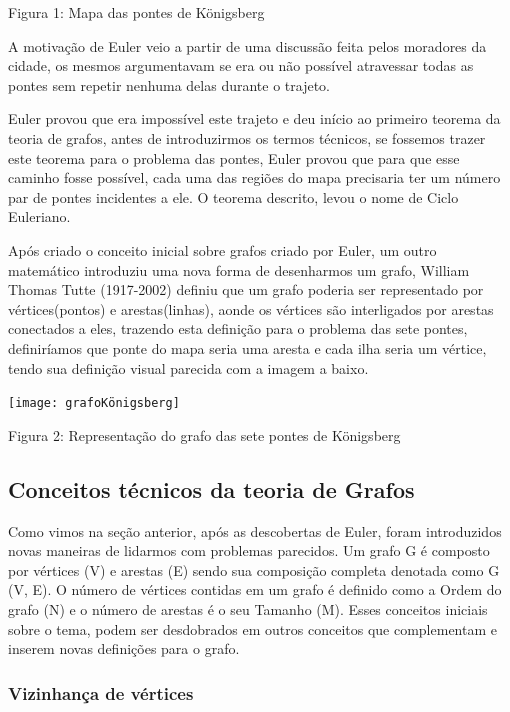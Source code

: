 \documentclass[12pt]{article}
\begin{document}
    Figura 1: Mapa das pontes de Königsberg
   
    A motivação de Euler veio a partir de uma discussão feita pelos moradores da cidade, os mesmos argumentavam se era ou não possível atravessar todas as pontes sem repetir nenhuma delas durante o trajeto.
   
   Euler provou que era impossível este trajeto e deu início ao primeiro teorema da teoria de grafos, antes de introduzirmos os termos técnicos, se fossemos trazer este teorema para o problema das pontes, Euler provou que para que esse caminho fosse possível, cada uma das regiões do mapa precisaria ter um número par de pontes incidentes a ele. O teorema descrito, levou o nome de Ciclo Euleriano.
   
   Após criado o conceito inicial sobre grafos criado por Euler, um outro matemático introduziu uma nova forma de desenharmos um grafo, William Thomas Tutte (1917-2002) definiu que um grafo poderia ser representado por vértices(pontos) e arestas(linhas), aonde os vértices são interligados por arestas conectados a eles, trazendo esta definição para o problema das sete pontes, definiríamos que ponte do mapa seria uma aresta e cada ilha seria um vértice, tendo sua definição visual parecida com a imagem a baixo.
   
   {\centering  \texttt{[image: grafoKönigsberg]}\par} 
   
   Figura 2:  Representação do grafo das sete pontes de Königsberg
   
   	\subsection{Conceitos técnicos da teoria de Grafos}
   	
   	Como vimos na seção anterior, após as descobertas de Euler, foram introduzidos novas maneiras de lidarmos com problemas parecidos.
   	Um grafo G é composto por vértices (V) e arestas (E) sendo sua composição completa denotada como G (V, E). O número de vértices contidas em um grafo é definido como a Ordem do grafo (N) e o número de arestas é o seu Tamanho (M). Esses conceitos iniciais sobre o tema, podem ser desdobrados em outros conceitos que complementam e inserem novas definições para o grafo.
   	
   	\subsubsection{Vizinhança de vértices}
   	
\end{document}
